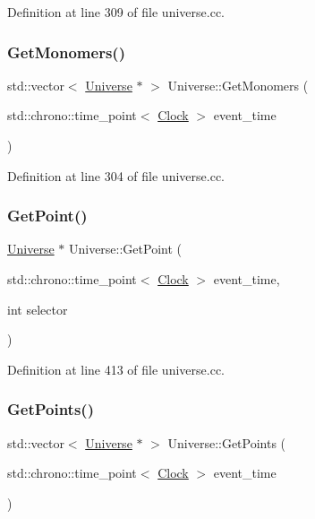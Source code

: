 Definition at line 309 of file universe.\+cc.

\mbox{\label{class_universe_aca82a914e0f8bd7cd1ec80a7220f0a0e}} 
\subsubsection{\texorpdfstring{Get\+Monomers()}{GetMonomers()}}
{\footnotesize\ttfamily std\+::vector$<$ \mbox{\hyperlink{class_universe}{Universe}} $\ast$ $>$ Universe\+::\+Get\+Monomers (\begin{DoxyParamCaption}\item[{std\+::chrono\+::time\+\_\+point$<$ \mbox{\hyperlink{universe_8h_a0ef8d951d1ca5ab3cfaf7ab4c7a6fd80}{Clock}} $>$}]{event\+\_\+time }\end{DoxyParamCaption})}



Definition at line 304 of file universe.\+cc.

\mbox{\label{class_universe_a3774f14a13a55827a1a4eea0a404edcb}} 
\subsubsection{\texorpdfstring{Get\+Point()}{GetPoint()}}
{\footnotesize\ttfamily \mbox{\hyperlink{class_universe}{Universe}} $\ast$ Universe\+::\+Get\+Point (\begin{DoxyParamCaption}\item[{std\+::chrono\+::time\+\_\+point$<$ \mbox{\hyperlink{universe_8h_a0ef8d951d1ca5ab3cfaf7ab4c7a6fd80}{Clock}} $>$}]{event\+\_\+time,  }\item[{int}]{selector }\end{DoxyParamCaption})}



Definition at line 413 of file universe.\+cc.

\mbox{\label{class_universe_a765c6c658b7a465cd92418690db846ae}} 
\subsubsection{\texorpdfstring{Get\+Points()}{GetPoints()}}
{\footnotesize\ttfamily std\+::vector$<$ \mbox{\hyperlink{class_universe}{Universe}} $\ast$ $>$ Universe\+::\+Get\+Points (\begin{DoxyParamCaption}\item[{std\+::chrono\+::time\+\_\+point$<$ \mbox{\hyperlink{universe_8h_a0ef8d951d1ca5ab3cfaf7ab4c7a6fd80}{Clock}} $>$}]{event\+\_\+time }\end{DoxyParamCaption})}



